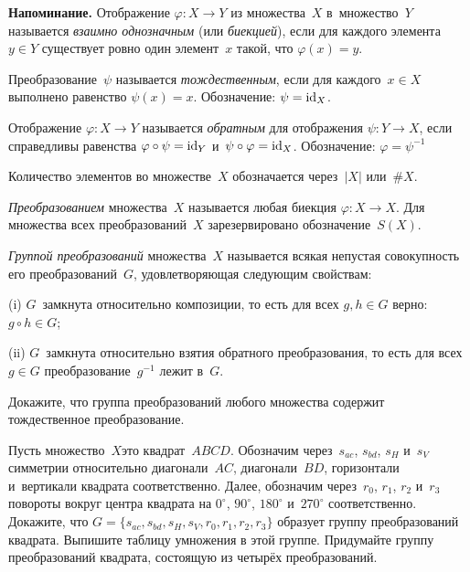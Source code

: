 \documentclass[a4paper,12pt]{article}
\newenvironment{напоминание}{\medskip\textbf{Напоминание.}}{\par}
\begin{document}
\begin{напоминание}
Отображение $\varphi\colon X\to Y$ из множества~$X$ в~множество~$Y$ называется \emph{взаимно однозначным} (или \emph{биекцией}), если для каждого элемента $y\in Y$ существует ровно один элемент~$x$ такой, что $\varphi(x)=y$.\par
Преобразование~$\psi$ называется \emph{тождественным}, если для каждого~$x\in X$ выполнено равенство $\psi(x)=x$. Обозначение: $\psi=\operatorname{id}_X$.\par
Отображение $\varphi\colon X\to Y$ называется \emph{обратным} для отображения $\psi\colon Y\to X$, если справедливы равенства $\varphi\circ\psi=\operatorname{id}_Y$ и~$\psi\circ\varphi=\operatorname{id}_X$. Обозначение: $\varphi=\psi^{-1}$\par
Количество элементов во множестве~$X$ обозначается через~$|X|$ или~$\#X$.
\end{напоминание}

\emph{Преобразованием} множества~$X$ называется любая биекция $\varphi\colon X\to X$. Для множества всех преобразований~$X$ зарезервировано обозначение~$S(X)$.

\emph{Группой преобразований} множества~$X$ называется всякая непустая совокупность его преобразований~$G$, удовлетворяющая следующим свойствам:
\begin{items}{-5}
\item[(i)]
$G$~замкнута относительно композиции, то есть для всех $g,h\in G$ верно: $g\circ h\in G$;
\item[(ii)]
$G$~замкнута относительно взятия обратного преобразования, то есть для всех $g\in G$  преобразование~$g^{-1}$ лежит в~$G$.
\end{items}

Докажите, что группа преобразований любого множества содержит тождественное преобразование.


\label{square}
Пусть множество~$X$\т это квадрат~$ABCD$. Обозначим через~$s_{ac}$, $s_{bd}$, $s_H$ и~$s_V$ симметрии относительно диагонали~$AC$, диагонали~$BD$, горизонтали и~вертикали квадрата соответственно. Далее, обозначим через~$r_0$, $r_1$, $r_2$ и~$r_3$ повороты вокруг центра квадрата на $0^\circ$, $90^\circ$, $180^\circ$ и~$270^\circ$ соответственно.
Докажите, что $G=\{s_{ac},s_{bd},s_H,s_V,r_0,r_1,r_2,r_3\}$ образует группу преобразований квадрата.
Выпишите таблицу умножения в этой группе.
Придумайте группу преобразований квадрата, состоящую из четырёх преобразований.
\end{document}
